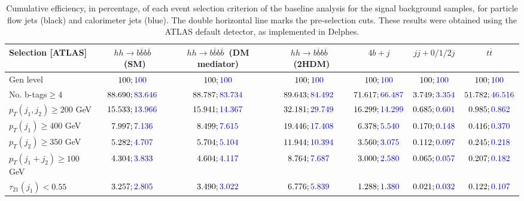 \begin{landscape}
	\begin{table}
		\centering
		\caption{Cumulative efficiency, in percentage, of each event selection criterion of the baseline analysis for the signal background samples, for particle flow jets (black) and calorimeter jets (blue). The double horizontal line marks the pre-selection cuts. These results were obtained using the ATLAS default detector, as implemented in Delphes.}
		\begin{tabular}{lcccccc}
			\toprule 
			\textbf{Selection [ATLAS]} & $hh\rightarrow b\overline{b}b\overline{b}$~(SM) & $hh\rightarrow b\overline{b}b\overline{b}$~(DM mediator) & $hh\rightarrow b\overline{b}b\overline{b}$~(2HDM) & $4b+j$  & $jj+0/1/2 j$ & $t\overline{t}$ \\
			\midrule
			Gen level & $100;\textcolor{blue}{100}$ & $100;\textcolor{blue}{100}$ &$100;\textcolor{blue}{100}$& $100;\textcolor{blue}{100}$& $100;\textcolor{blue}{100}$& $100;\textcolor{blue}{100}$ \\
			\rowcolor{black!7}No. b-tags$\geq 4$&$88.690;\textcolor{blue}{83.646}$&$88.787;\textcolor{blue}{83.734}$&$89.643;\textcolor{blue}{84.492}$&$71.617;\textcolor{blue}{66.487}$&$3.749;\textcolor{blue}{3.354}$&$51.782;\textcolor{blue}{46.516}$\\
			$p_T(j_1,j_2)\geq200$ GeV & $15.533;\textcolor{blue}{13.966}$ & $15.941;\textcolor{blue}{14.367}$&$32.181;\textcolor{blue}{29.749}$ &$16.299;\textcolor{blue}{14.299}$&$0.685;\textcolor{blue}{0.601}$&$0.985;\textcolor{blue}{0.862}$\\ 
			\midrule \midrule
			\rowcolor{black!7}$p_T(j_1)\geq 400$ GeV & $7.997;\textcolor{blue}{7.136}$ &$8.499;\textcolor{blue}{7.615}$  &$19.446;\textcolor{blue}{17.408}$&$6.378;\textcolor{blue}{5.540}$&$0.170;\textcolor{blue}{0.148}$&$0.416;\textcolor{blue}{0.370}$\\ 
			$p_T(j_2)\geq 350$ GeV & $5.282;\textcolor{blue}{4.707}$& $5.704;\textcolor{blue}{5.104}$&$11.944;\textcolor{blue}{10.394}$&$3.560;\textcolor{blue}{3.075}$&$0.112;\textcolor{blue}{0.097}$&$0.245;\textcolor{blue}{0.218}$\\
			\rowcolor{black!7}$p_T(j_1+j_2)\geq 100$ GeV &$4.304;\textcolor{blue}{3.833}$ & $4.604;\textcolor{blue}{4.117}$ &$8.764;\textcolor{blue}{7.687}$&$3.000;\textcolor{blue}{2.580}$&$0.065;\textcolor{blue}{0.057}$&$0.207;\textcolor{blue}{0.182}$\\
			$\tau_{21}(j_1)<0.55$ & $3.257;\textcolor{blue}{2.805}$& $3.490;\textcolor{blue}{3.022}$&$6.776;\textcolor{blue}{5.839}$&$1.288;\textcolor{blue}{1.380}$&$0.021;\textcolor{blue}{0.032}$&$0.122;\textcolor{blue}{0.107}$\\

\end{tabular}
\end{table}
\end{landscape}
